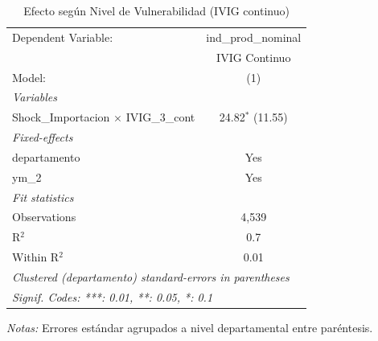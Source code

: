 \documentclass[12pt]{article}
\begin{document}
\begin{table}[htbp]
\centering
\begin{threeparttable}

   \caption{Efecto según Nivel de Vulnerabilidad (IVIG continuo)}
   \centering
   \small
   \begin{tabular}{lc}
      \tabularnewline \midrule \midrule
      Dependent Variable:                           & ind\_prod\_nominal\\    
                                                    & IVIG Continuo \\   
      Model:                                        & (1)\\  
      \midrule
      \emph{Variables}\\
      Shock\_Importacion $\times$ IVIG\_3\_cont     & 24.82$^{*}$ (11.55)\\   
      \midrule
      \emph{Fixed-effects}\\
      departamento                                  & Yes\\  
      ym\_2                                         & Yes\\  
      \midrule
      \emph{Fit statistics}\\
      Observations                                  & 4,539\\  
      R$^2$                                         & 0.7\\  
      Within R$^2$                                  & 0.01\\  
      \midrule \midrule
      \multicolumn{2}{l}{\emph{Clustered (departamento) standard-errors in parentheses}}\\
      \multicolumn{2}{l}{\emph{Signif. Codes: ***: 0.01, **: 0.05, *: 0.1}}\\
   \end{tabular}


\begin{tablenotes}
\footnotesize
\item \textit{Notas:} Errores estándar agrupados a nivel departamental entre paréntesis.
\end{tablenotes}
\end{threeparttable}
\end{table}
\end{document}
